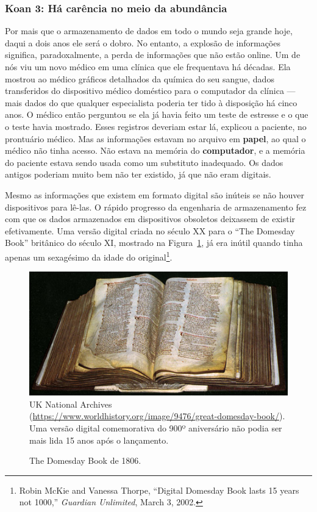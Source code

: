 \subsubsection*{Koan 3: Há carência no meio da abundância}
\label{cap1:exp-dig-koans:3}
Por mais que o armazenamento de dados em todo o mundo seja grande hoje, daqui a
dois anos ele será o dobro. No entanto, a explosão de informações significa, 
paradoxalmente, a perda de informações que não estão online. Um de nós viu um 
novo médico em uma clínica que ele frequentava há décadas. Ela mostrou ao médico
gráficos detalhados da química do seu sangue, dados transferidos do dispositivo
médico doméstico para o computador da clínica --- mais dados do que qualquer
especialista poderia ter tido à disposição há cinco anos. O médico então
perguntou se ela já havia feito um teste de estresse e o que o teste havia 
mostrado. Esses registros deveriam estar lá, explicou a paciente, no prontuário
médico. Mas as informações estavam no arquivo em \textbf{papel}, ao qual o 
médico não tinha acesso. Não estava na memória do \textbf{computador}, e a
memória do paciente estava sendo usada como um substituto inadequado. Os dados
antigos poderiam muito bem não ter existido, já que não eram digitais.

Mesmo as informações que existem em formato digital são inúteis se não houver 
dispositivos para lê-las. O rápido progresso da engenharia de armazenamento fez 
com que os dados armazenados em dispositivos obsoletos deixassem de existir 
efetivamente. Uma versão digital criada no século XX para o ``The Domesday Book''
britânico do século XI, mostrado na Figura~\ref{fig:domesday}, já era inútil
quando tinha apenas um sexagésimo da idade do original\footnote{Robin McKie and
Vanessa Thorpe, ``Digital Domesday Book lasts 15 years not 1000,''
\textit{Guardian Unlimited}, March 3, 2002.}.

\begin{figure}[h]
\centering
\caption{The Domesday Book de 1806.}
\label{fig:domesday}
\vspace{-0.3cm}
\includegraphics[scale=0.5]{imagens/domesday.jpg}
\\
\scriptsize{UK National Archives
(\url{https://www.worldhistory.org/image/9476/great-domesday-book/}). Uma versão
digital comemorativa do 900º aniversário não podia ser mais lida 15 anos após
o lançamento.}
\end{figure}

